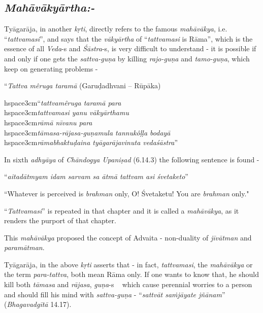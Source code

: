 \subsection*{\textit{Mahāvākyārtha:-}}

Tyāgarāja, in another \textit{kṛti}, directly refers to the famous \textit{mahāvākya}, i.e. “\textit{tattvamasi}”, and says that the \textit{vākyārtha} of “\textit{tattvamasi} is Rāma”, which is the essence of all \textit{Veda}-s and \textit{Śāstra}-s, is very difficult to understand - it is possible if and only if one gets the \textit{sattva-guṇa} by killing \textit{rajo-guṇa} and \textit{tamo-guṇa}, which keep on generating problems -

“\textit{Tattva mêruga taramā} (Garuḍadhvani – Rūpāka)

\begin{myquote}
hspace{3cm}“\textit{tattvamêruga taramā para}\\hspace{3cm}\textit{tattvamasi yanu vākyārthamu}\\hspace{3cm}\textit{rāmā nīvanu para}\\hspace{3cm}\textit{tāmasa-rājasa-guṇamula tannukôḷḷa bodayā}\\hspace{3cm}\textit{rāmabhaktuḍaina tyāgarājavinuta vedaśāstra}”
\end{myquote}

In sixth \textit{adhyāya} of \textit{Chāndogya Upaniṣad} (6.14.3) the following sentence is found -

\begin{myquote}
“\textit{aitadātmyam idam sarvam sa ātmā tattvam asi śvetaketo}”
\end{myquote}

``Whatever is perceived is \textit{brahman} only, O! Śvetaketu! You are \textit{brahman} only."

“\textit{Tattvamasi}” is repeated in that chapter and it is called a \textit{mahāvākya}, as it renders the purport of that chapter.

This \textit{mahāvākya} proposed the concept of Advaita - non-duality of \textit{jīvātman} and \textit{paramātman}.

Tyāgarāja, in the above \textit{kṛti} asserts that - in fact, \textit{tattvamasi}, the \textit{mahāvākya} or the term \textit{para-tattva}, both mean Rāma only. If one wants to know that, he should kill both \textit{tāmasa} and \textit{rājasa}, \textit{guṇa}-s   which cause perennial worries to a person and should fill his mind with \textit{sattva-guṇa} - “\textit{sattvāt saṁjāyate jñānam}” (\textit{Bhagavadgītā} 14.17).


